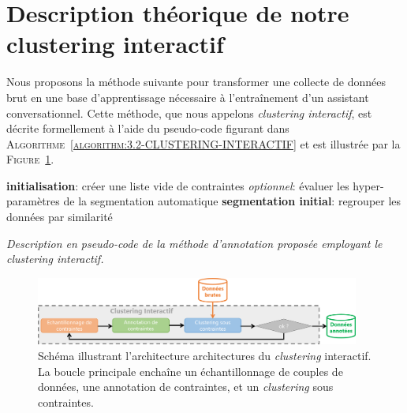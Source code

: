     \section{Description théorique de notre clustering interactif}
	\label{section:3.2-DESCRIPTION-THEORIQUE}
    
		Nous proposons la méthode suivante pour transformer une collecte de données brut en une base d'apprentissage nécessaire à l’entraînement d'un assistant conversationnel.
		Cette méthode, que nous appelons \textit{clustering interactif}, est décrite formellement à l'aide du pseudo-code figurant dans \textsc{Algorithme~\ref{algorithm:3.2-CLUSTERING-INTERACTIF}} et est illustrée par la \textsc{Figure~\ref{figure:3.2-CLUSTERING-INTERACTIF}}.
		
		\begin{algorithm}
			\textbf{initialisation}: créer une liste vide de contraintes \;
			\textit{optionnel}: évaluer les hyper-paramètres de la segmentation automatique \;
		    \textbf{segmentation initial}: regrouper les données par similarité \;
			\caption{\textit{Description en pseudo-code de la méthode d'annotation proposée employant le clustering interactif.}}
		    \label{algorithm:3.2-CLUSTERING-INTERACTIF}
		\end{algorithm}
		
		
		\begin{figure}[!htb]
			\centering
			\includegraphics[width=0.95\textwidth]{figures/interactive-clustering-architecture-sequentielle}
			\caption{Schéma illustrant l'architecture architectures du \textit{clustering} interactif. La boucle principale enchaîne un échantillonnage de couples de données, une annotation de contraintes, et un \textit{clustering} sous contraintes.}
			\label{figure:3.2-CLUSTERING-INTERACTIF}
		\end{figure}
		
